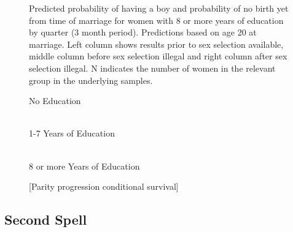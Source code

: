 \documentclass[12pt,letterpaper]{article}
\begin{document}
\begin{figure}[htpb]
{\begin{minipage}{0.31\textwidth}
\captionsetup[subfigure]{labelformat=parens}
\end{minipage}
}
\setcounter{subfigure}{3}
\caption{Predicted probability of having a boy and probability of
no birth yet from time of marriage for women with 8 or more years of education by quarter
(3 month period). 
Predictions based on age 20 at marriage.
Left column shows results prior to sex selection available, middle column before
sex selection illegal and right column after sex selection illegal.
N indicates the number of women in the relevant group in the underlying samples.
}
\label{fig:results_spell1_high}
\end{figure}


\begin{figure}[htpb]
\centering
\caption*{No Education}
 \\
\caption*{1-7 Years of Education}
 \\
\caption*{8 or more Years of Education}
\caption{[Parity progression conditional survival]}
\label{fig:results_spell1_pps}
\end{figure}


\clearpage
\newpage

\subsection{Second Spell}
\end{document}
